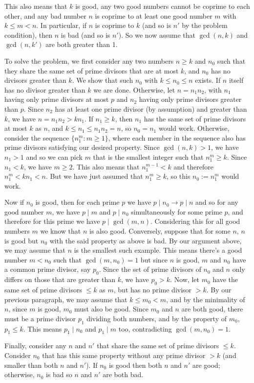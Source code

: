 \documentclass[11pt,a4paper]{article}
\begin{document}
\begin{enumerate}
\begin{itemize}
		\end{itemize}
		This also means that $k$ is good, any two good numbers cannot be coprime to each other, and any bad number $n$ is coprime to at least one good number $m$ with $k\le m<n$. 
		In particular, if $n$ is coprime to $k$ (and so is $n'$ by the problem condition), then $n$ is bad (and so is $n'$). So we now assume that $\gcd(n, k)$ and $\gcd(n, k')$ are both greater than 1. 
		
		To solve the problem, we first consider any two numbers $n\ge k$ and $n_0$ such that they share the same set of prime divisors that are at most $k$, and $n_0$ has no divisors greater than $k$. We show that such $n_0$ with $k\le n_0\le n$ exists. 
		If $n$ itself has no divisor greater than $k$ we are done. 
		Otherwise, let $n=n_1n_2$, with $n_1$ having only prime divisors at most $p$ and $n_2$ having only prime divisors greater than $p$. Since $n_2$ has at least one prime divisor (by assumption) and greater than $k$, we have $n=n_1n_2>kn_1$. If $n_1\ge k$, then $n_1$ has the same set of prime divisors at most $k$ as $n$, and $k\le n_1\le n_1n_2=n$, so $n_0=n_1$ would work. 
		Otherwise, consider the sequence $\{n_1^m: m\ge 1\}$, where each member in the sequence also has prime divisors satisfying our desired property. 
		Since $\gcd(n, k)>1$, we have $n_1>1$ and so we can pick $m$ that is the smallest integer such that $n_1^m\ge k$. Since $n_1<k$, we have $m\ge 2$. This also means that $n_1^{m-1}<k$ and therefore $n_1^m<kn_1<n$. But we have just assumed that $n_1^m\ge k$, so this $n_0:=n_1^m$ would work. 
		
		Now if $n_0$ is good, then for each prime $p$ we have $p\mid n_0\to p\mid n$ and so for any good number $m$, we have $p\mid m$ and $p\mid n_0$ simultaneously for some prime $p$, and therefore for this prime we have $p\mid\gcd(m, n)$. Considering this for all good numbers $m$ we know that $n$ is also good. 
		Conversely, suppose that for some $n$, $n$ is good but $n_0$ with the said property as above is bad. By our argument above, we may assume that $n$ is the smallest such example. This means there's a good number $m<n_0$ such that $\gcd(m, n_0)=1$ but since $n$ is good, $m$ and $n_0$ have a common prime divisor, say $p_0$. 
		Since the set of prime divisors of $n_0$ and $n$ only differs on those that are greater than $k$, 
		we have $p_0>k$. 
		Now, let $m_0$ have the same set of prime divisors $\le k$ as $m$, but has no prime divisor $>k$. 
		By our previous paragraph, we may assume that $k\le m_0<m$, and by the minimality of $n$, since $m$ is good, $m_0$ must also be good. 
		Since $m_0$ and $n$ are both good, there must be a prime divisor $p_1$ dividing both numbers, and by the property of $m_0$, $p_1\le k$. This means $p_1\mid n_0$ and $p_1\mid m$ too, contradicting $\gcd(m, n_0)=1$. 
		
		Finally, consider any $n$ and $n'$ that share the same set of prime divisors $\le k$. Consider $n_0$ that has this same property without any prime divisor $>k$ (and smaller than both $n$ and $n'$). If $n_0$ is good then both $n$ and $n'$ are good; otherwise, $n_0$ is bad so $n$ and $n'$ are both bad. 
		
	 
\end{enumerate}
\end{document}
